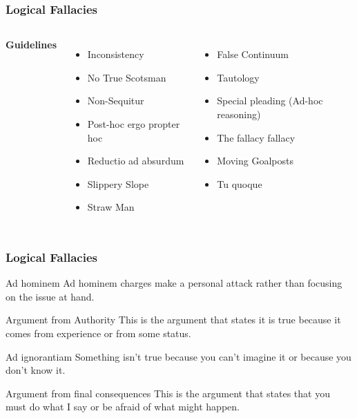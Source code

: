 \documentclass{beamer}
\begin{document}
\begin{frame}
\frametitle{Logical Fallacies}
\begin{columns}[c]

\textbf{Guidelines}
\begin{itemize}
\item Inconsistency
\item No True Scotsman
\item Non-Sequitur
\item Post-hoc ergo propter hoc
\item Reductio ad absurdum
\item Slippery Slope
\item Straw Man
\end{itemize}

\begin{itemize}
\item False Continuum
\item Tautology
\item Special pleading (Ad-hoc reasoning)
\item The fallacy fallacy
\item Moving Goalposts
\item Tu quoque
\end{itemize}
\end{columns}
\end{frame}
\begin{frame}
\frametitle{Logical Fallacies}
\begin{block}{Ad hominem}
Ad hominem charges make a personal attack rather than focusing on the issue at hand.
\end{block}

\begin{block}{Argument from Authority}
This is the argument that states it is true because it comes from experience or from some status.
\end{block}

\begin{block}{Ad ignorantiam}
Something isn't true because you can't imagine it or because you don't know it.
\end{block}

\begin{block}{Argument from final consequences}
This is the argument that states that you must do what I say or be afraid of what might happen.
\end{block}
\end{frame}
\end{document}
